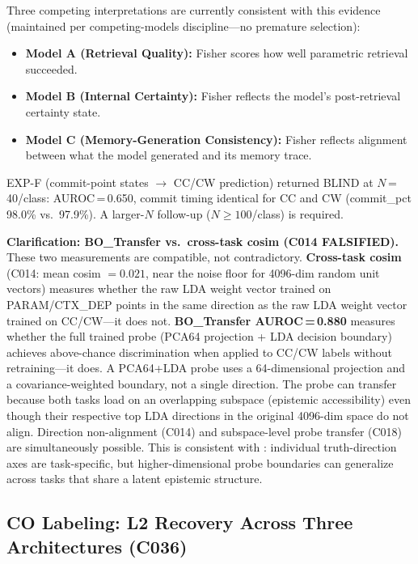 \documentclass[11pt]{article}
\begin{document}
Three competing interpretations are currently consistent with this evidence
(maintained per competing-models discipline---no premature selection):

\begin{itemize}[leftmargin=2em]
\item \textbf{Model A (Retrieval Quality):} Fisher scores how well parametric retrieval
  succeeded.
\item \textbf{Model B (Internal Certainty):} Fisher reflects the model's post-retrieval
  certainty state.
\item \textbf{Model C (Memory-Generation Consistency):} Fisher reflects alignment between
  what the model generated and its memory trace.
\end{itemize}

EXP-F (commit-point states $\to$ CC/CW prediction) returned BLIND at $N$\,=\,40/class:
AUROC\,=\,0.650, commit timing identical for CC and CW (commit\_pct 98.0\% vs.\ 97.9\%).
A larger-$N$ follow-up ($N \geq 100$/class) is required.

\textbf{Clarification: BO\_Transfer vs.\ cross-task cosim (C014 FALSIFIED).}
These two measurements are compatible, not contradictory. \textbf{Cross-task cosim}
(C014: mean cosim $= 0.021$, near the noise floor for 4096-dim random unit vectors)
measures whether the raw LDA weight vector trained on PARAM/CTX\_DEP points in the
same direction as the raw LDA weight vector trained on CC/CW---it does not.
\textbf{BO\_Transfer AUROC\,=\,0.880} measures whether the full trained probe
(PCA64 projection + LDA decision boundary) achieves above-chance discrimination when
applied to CC/CW labels without retraining---it does. A PCA64+LDA probe uses a
64-dimensional projection and a covariance-weighted boundary, not a single direction.
The probe can transfer because both tasks load on an overlapping subspace
(epistemic accessibility) even though their respective top LDA directions in the
original 4096-dim space do not align. Direction non-alignment (C014) and
subspace-level probe transfer (C018) are simultaneously possible. This is
consistent with \citet{azizian2025orthogonal}: individual truth-direction axes are
task-specific, but higher-dimensional probe boundaries can generalize across tasks
that share a latent epistemic structure.

\subsection{CO Labeling: L2 Recovery Across Three Architectures (C036)}
\label{sec:co_labeling}
\end{document}

